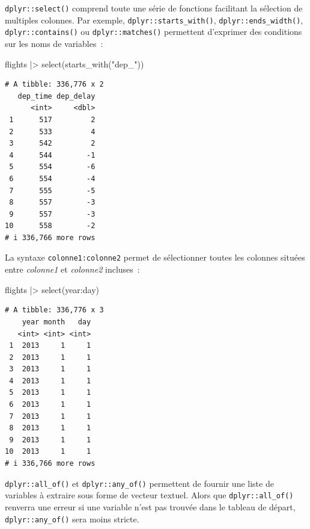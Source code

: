 \documentclass[
  letterpaper,
  DIV=11,
  numbers=noendperiod,
  oneside]{scrreprt}
\newenvironment{Shaded}{\begin{snugshade}}{\end{snugshade}}
\newcommand{\FunctionTok}[1]{\textcolor[rgb]{0.28,0.35,0.67}{#1}}
\newcommand{\NormalTok}[1]{\textcolor[rgb]{0.00,0.23,0.31}{#1}}
\newcommand{\SpecialCharTok}[1]{\textcolor[rgb]{0.37,0.37,0.37}{#1}}
\newcommand{\StringTok}[1]{\textcolor[rgb]{0.13,0.47,0.30}{#1}}
\begin{document}
\texttt{dplyr::select()} comprend toute une série de fonctions
facilitant la sélection de multiples colonnes. Par exemple,
\texttt{dplyr::starts\_with()}, \texttt{dplyr::ends\_width()},
\texttt{dplyr::contains()} ou \texttt{dplyr::matches()} permettent
d'exprimer des conditions sur les noms de variables~:

\begin{Shaded}
\begin{Highlighting}[]
\NormalTok{flights }\SpecialCharTok{|\textgreater{}} 
  \FunctionTok{select}\NormalTok{(}\FunctionTok{starts\_with}\NormalTok{(}\StringTok{"dep\_"}\NormalTok{))}
\end{Highlighting}
\end{Shaded}

\begin{verbatim}
# A tibble: 336,776 x 2
   dep_time dep_delay
      <int>     <dbl>
 1      517         2
 2      533         4
 3      542         2
 4      544        -1
 5      554        -6
 6      554        -4
 7      555        -5
 8      557        -3
 9      557        -3
10      558        -2
# i 336,766 more rows
\end{verbatim}

La syntaxe \texttt{colonne1:colonne2} permet de sélectionner toutes les
colonnes situées entre \emph{colonne1} et \emph{colonne2}
incluses~:

\begin{Shaded}
\begin{Highlighting}[]
\NormalTok{flights }\SpecialCharTok{|\textgreater{}} 
  \FunctionTok{select}\NormalTok{(year}\SpecialCharTok{:}\NormalTok{day)}
\end{Highlighting}
\end{Shaded}

\begin{verbatim}
# A tibble: 336,776 x 3
    year month   day
   <int> <int> <int>
 1  2013     1     1
 2  2013     1     1
 3  2013     1     1
 4  2013     1     1
 5  2013     1     1
 6  2013     1     1
 7  2013     1     1
 8  2013     1     1
 9  2013     1     1
10  2013     1     1
# i 336,766 more rows
\end{verbatim}

\texttt{dplyr::all\_of()} et \texttt{dplyr::any\_of()} permettent de
fournir une liste de variables à extraire sous forme de vecteur textuel.
Alors que \texttt{dplyr::all\_of()} renverra une erreur si une variable
n'est pas trouvée dans le tableau de départ, \texttt{dplyr::any\_of()}
sera moins stricte.
\end{document}
